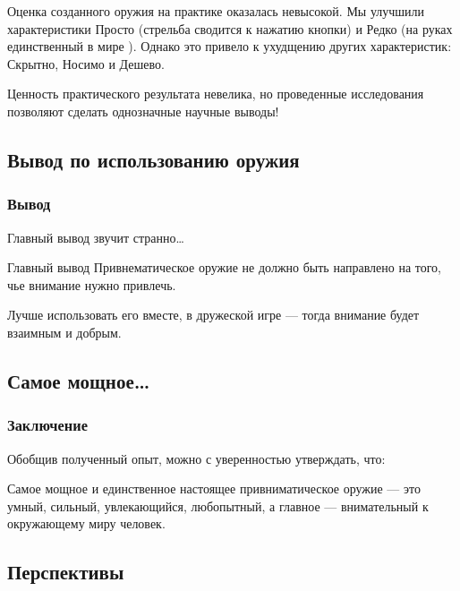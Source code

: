 Оценка созданного оружия на практике оказалась невысокой. Мы улучшили характеристики \alert{Просто} (стрельба сводится к нажатию кнопки) и \alert{Редко} (на руках единственный в мире {\myDevice}). Однако это привело к ухудщению других характеристик: Скрытно, Носимо и Дешево.

Ценность практического результата невелика, но проведенные исследования позволяют сделать однозначные научные выводы!


\subsection{Вывод по использованию оружия}

\begin{frame}
    \frametitle{Вывод}
    
    Главный вывод звучит странно\ldots 
    
    \begin{block}{Главный вывод}
        Привнематическое оружие \alert{не должно} быть направлено на того, чье внимание нужно привлечь. 
    \end{block}
    
    \par\bigskip
    
    Лучше использовать его вместе, в дружеской игре --- тогда внимание будет \alert{взаимным} и \alert{добрым}.
\end{frame}


\subsection{Самое мощное\ldots}

\begin{frame}
    \frametitle{Заключение}
    
    Обобщив полученный опыт, можно с уверенностью утверждать, что:
    
    \begin{block}{}
        Самое мощное и \alert{единственное настоящее} привниматическое оружие --- это умный, сильный, увлекающийся, любопытный, а главное --- \alert{внимательный к окружающему миру} человек.
    \end{block}
\end{frame}

    
\subsection{Перспективы}

